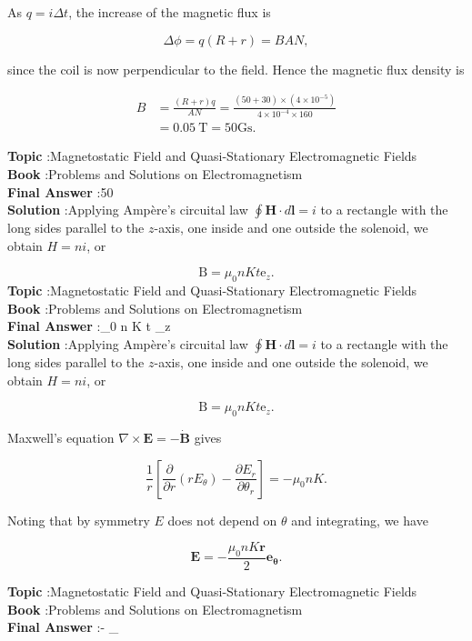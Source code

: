\documentclass[10pt]{article}
\begin{document}
As $q=i \Delta t$, the increase of the magnetic flux is

$$
\Delta \phi=q(R+r)=B A N,
$$

since the coil is now perpendicular to the field. Hence the magnetic flux density is

$$
\begin{aligned}
B &=\frac{(R+r) q}{A N}=\frac{(50+30) \times\left(4 \times 10^{-5}\right)}{4 \times 10^{-4} \times 160} \\
&=0.05 \mathrm{~T}=50 \mathrm{Gs} .
\end{aligned}
$$

\textbf{Topic} :Magnetostatic Field and Quasi-Stationary Electromagnetic Fields\\
\textbf{Book} :Problems and Solutions on Electromagnetism\\
\textbf{Final Answer} :50 \\


\textbf{Solution} :Applying Ampère's circuital law $\oint \mathbf{H} \cdot d \mathbf{l}=i$ to a rectangle with the long sides parallel to the $z$-axis, one inside and one outside the solenoid, we obtain $H=n i$, or

$$
\mathrm{B}=\mu_{0} n K t \mathrm{e}_{z} .
$$
\textbf{Topic} :Magnetostatic Field and Quasi-Stationary Electromagnetic Fields\\
\textbf{Book} :Problems and Solutions on Electromagnetism\\
\textbf{Final Answer} :\mu_{0} n K t _{z}\\


\textbf{Solution} :Applying Ampère's circuital law $\oint \mathbf{H} \cdot d \mathbf{l}=i$ to a rectangle with the long sides parallel to the $z$-axis, one inside and one outside the solenoid, we obtain $H=n i$, or

$$
\mathrm{B}=\mu_{0} n K t \mathrm{e}_{z} .
$$

 Maxwell's equation $\nabla \times \mathbf{E}=-\dot{\mathbf{B}}$ gives

$$
\frac{1}{r}\left[\frac{\partial}{\partial r}\left(r E_{\theta}\right)-\frac{\partial E_{r}}{\partial \theta_{r}}\right]=-\mu_{0} n K .
$$

Noting that by symmetry $E$ does not depend on $\theta$ and integrating, we have

$$
\mathbf{E}=-\frac{\mu_{0} n K \boldsymbol{r}}{2} \mathbf{e}_{\boldsymbol{\theta}} .
$$


\textbf{Topic} :Magnetostatic Field and Quasi-Stationary Electromagnetic Fields\\
\textbf{Book} :Problems and Solutions on Electromagnetism\\
\textbf{Final Answer} :- _{\boldsymbol{\theta}}\\
\end{document}
